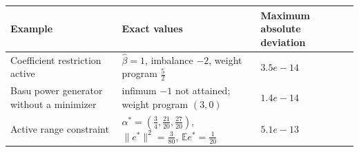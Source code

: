 \begin{tabular}{lll}
\hline
Example & Exact values & Maximum absolute deviation \\
\hline
Coefficient restriction active & $\widehat\beta=1$, imbalance $-2$, weight program $\frac{5}{2}$ & $3.5e-14$ \\
Basu power generator without a minimizer & infimum $-1$ not attained; weight program $(3,0)$ & $1.4e-14$ \\
Active range constraint & $\alpha^*=(\frac{3}{4},\frac{21}{20},\frac{27}{20})$, $\|e^*\|^2=\frac{3}{80}$, $\mathbb{E} e^*=\frac{1}{20}$ & $5.1e-13$ \\
\hline
\end{tabular}
